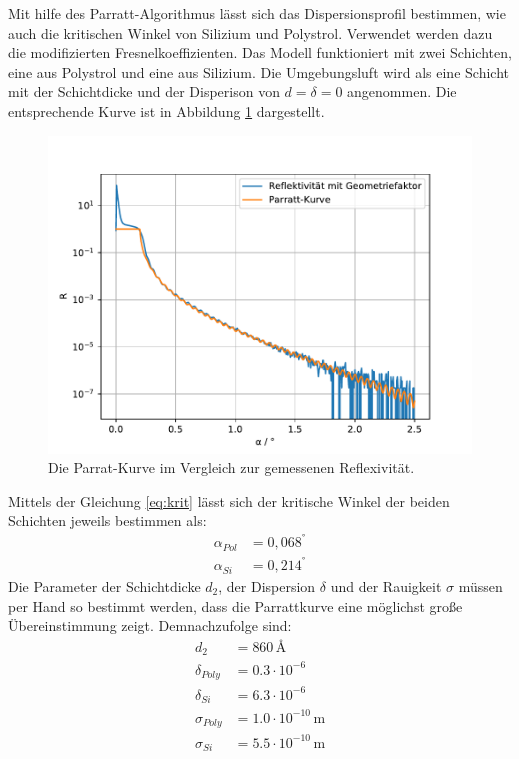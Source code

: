 Mit hilfe des Parratt-Algorithmus lässt sich das Dispersionsprofil bestimmen,
wie auch die kritischen Winkel von Silizium und Polystrol.
Verwendet werden dazu die modifizierten Fresnelkoeffizienten.
Das Modell funktioniert mit zwei Schichten, eine aus Polystrol und eine aus Silizium.
Die Umgebungsluft wird als eine Schicht mit der Schichtdicke und der Disperison von $d = \delta = 0$ angenommen.
Die entsprechende Kurve ist in Abbildung \ref{fig:parratt} dargestellt.
\begin{figure}[h]
    \centering
    \includegraphics[width = 1\textwidth]{Auswertung/Graphen/Parrat_Algorthmus.pdf}
    \caption{Die Parrat-Kurve im Vergleich zur gemessenen Reflexivität.}
    \label{fig:parratt}
\end{figure}
Mittels der Gleichung \eqref{eq:krit} lässt sich der kritische Winkel der beiden Schichten jeweils bestimmen als:
\begin{align}
    \alpha_{Pol} &= 0,068^° \\
    \alpha_{Si}  &= 0,214^°
\end{align}
Die Parameter der Schichtdicke $d_2$, der Dispersion $\delta$ und der Rauigkeit $\sigma$ müssen per Hand so bestimmt werden,
dass die Parrattkurve eine möglichst große Übereinstimmung zeigt.
Demnachzufolge sind:
\begin{align*} 
    d_2 &=  860 \, \text{\AA} \\
    \delta_{Poly} &= 0.3\cdot 10^{-6}\\
    \delta_{Si} &= 6.3\cdot 10^{-6}\\
    \sigma_{Poly} &=  1.0\cdot 10^{-10} \, \mathrm{m}\\
    \sigma_{Si} &=  5.5\cdot 10^{-10} \, \mathrm{m}
\end{align*}
